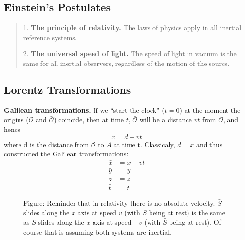 \documentclass[../../../main.tex]{subfiles}
\begin{document}
\subsection{Einstein's Postulates}
\begin{quote}
    1. \textbf{The principle of relativity.} The laws of physics apply in all inertial
reference systems.

    2. \textbf{The universal speed of light.} The speed of light in vacuum is the
same for all inertial observers, regardless of the motion of the source.
\end{quote}

\subsection{Lorentz Transformations}
\textbf{Galilean transformations.} If we “start the clock” ($t = 0$) at the moment the origins ($\mathcal{O}$ and $\bar{\mathcal{O}}$) coincide, then at time $t$, $\bar{\mathcal{O}}$ will be a distance $vt$ from $\mathcal{O}$, and hence
\begin{equation*}
    x=d + vt
\end{equation*}
where d is the distance from $\bar{\mathcal{O}}$ to $\bar{A}$ at time t. Classicaly, $d=\bar{x}$ and thus constructed the Galilean transformations:
\begin{align*}
    \bar{x} &= x - vt\\
    \bar{y} &= y\\
    \bar{z} &= z\\
    \bar{t} &= t
\end{align*}
\begin{figure}[b]
    \centering
    \caption*{Figure: Reminder that in relativity there is no absolute velocity. $\bar{S}$ slides along the $x$ axis at speed $v$ (with $S$ being at rest) is the same as $S$ slides along the $x$ axis at speed $-v$ (with $\bar{S}$ being at rest). Of course that is assuming both systems are inertial.}
\end{figure}
\end{document}
